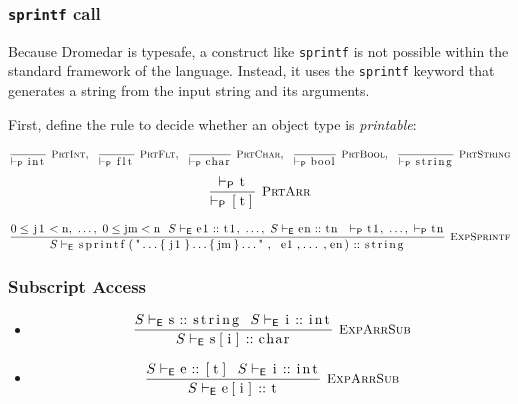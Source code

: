 \documentclass{article}
\newcommand{\code}[1]{\lstinline[columns=fixed]{#1}}
\newcommand{\drmrule}[5]{\frac{#1}{#2\vdash_{\mathsf{#3}}#4}\textsc{\ \small{#5}}}
\newcommand{\ruleapp}[1]{\vdash_{\mathsf{#1}}}
\newcommand{\mc}[1]{\textnormal{\code{#1}}}
\begin{document}
			\subsubsection{\code{sprintf} call}
			
				Because Dromedar is typesafe, a construct like \code{sprintf} is not possible within the standard framework of the language. Instead, it uses the \code{sprintf} keyword that generates a string from the input string and its arguments.
				
				First, define the rule to decide whether an object type is \textit{printable}:
				
				\begin{align*}
					\drmrule{}{}{P}{\mc{int}}{PrtInt},\ \ 
					\drmrule{}{}{P}{\mc{flt}}{PrtFlt},\ \ 
					\drmrule{}{}{P}{\mc{char}}{PrtChar},\ \ 
					\drmrule{}{}{P}{\mc{bool}}{PrtBool},\ \ 
					\drmrule{}{}{P}{\mc{string}}{PrtString}
				\end{align*}\begin{align*}
					\drmrule{\ruleapp{P}\mc{t}}{}{P}{\mc{[t]}}{PrtArr}
				\end{align*}
				
				\begin{align*}
					\drmrule{0\leq\mc{j1}<\mc{n},\ \dots,\ 0\leq\mc{jm}<\mc{n}\ \ S\ruleapp{E}\mc{e1}::\mc{t1},\ \dots,\ S\ruleapp{E}\mc{en}::\mc{tn}\ \ \ruleapp{P}\mc{t1},\ \dots,\ \ruleapp{P}\mc{tn}}{S}{E}{\mc{sprintf("...\{j1\}...\{jm\}...", e1,...,en)} :: \mc{string}}{ExpSprintf}
				\end{align*}
				
			\subsubsection{Subscript Access}
			
				\begin{itemize}
					\item
						\begin{align*}
							\drmrule{S\ruleapp{E}\mc{s}::\mc{string}\ \ S\ruleapp{E}\mc{i}::\mc{int}}{S}{E}{\mc{s[i]} :: \mc{char}}{ExpArrSub}
						\end{align*}
					\item
						\begin{align*}
							\drmrule{S\ruleapp{E}\mc{e}::\mc{[t]}\ \ S\ruleapp{E}\mc{i}::\mc{int}}{S}{E}{\mc{e[i]} :: \mc{t}}{ExpArrSub}
						\end{align*}
				\end{itemize}
			
\end{document}
